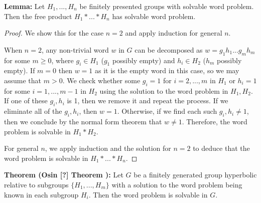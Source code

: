 \documentclass[12pt]{article}
\newcommand{\vs}{\vskip10pt}
\begin{document}
	\vs 
	
	\textbf{Lemma: } Let $H_1,...,H_n$ be finitely presented groups with solvable word problem. Then the free product $H_1 * ... * H_n$ has solvable word problem. 
	
	\begin{proof}
		
	We show this for the case $n = 2$ and apply induction for general $n$. 
	
	\vs 
	
	When $n=2$, any non-trivial word $w$ in $G$ can be decomposed as $w = g_1 h_1 ... g_m h_m$ for some $m \geq 0$, where $g_i \in H_1$ ($g_1$ possibly empty) and $h_i \in H_2$ ($h_m$ possibly empty). If $m = 0$ then $w = 1$ as it is the empty word in this case, so we may assume that $m > 0$. We check whether some $g_i = 1$ for $i = 2,...,m$ in $H_1$ or $h_i = 1$ for some $i = 1,...,m-1$ in $H_2$ using the solution to the word problem in $H_1, H_2$. If one of these $g_i, h_i$ is 1, then we remove it and repeat the process. If we eliminate all of the $g_i, h_i$, then $w = 1$. Otherwise, if we find each such $g_i, h_i \neq 1$, then we conclude by the normal form theorem that $w \neq 1$. Therefore, the word problem is solvable in $H_1 * H_2$. 
	
	\vs 
	
	For general $n$, we apply induction and the solution for $n = 2$ to deduce that the word problem is solvable in $H_1 * ... * H_n$.
	
	\end{proof}
	
	\vs
	
	\textbf{Theorem (Osin [?] Theorem ): } Let $G$ be a finitely generated group hyperbolic relative to subgroups $\{H_1,...,H_m\}$ with a solution to the word problem being known in each subgroup $H_i$. Then the word problem is solvable in $G$. 
	
\end{document}
